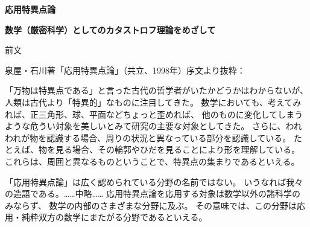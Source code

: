 \documentclass[uplatex,dvipdfmx]{jlreq}
\begin{document}
\begin{center}
  {\Huge\bfseries 応用特異点論}
\end{center}

\vspace{10pt}

\begin{center}
  {\Large\bfseries 数学（厳密科学）としてのカタストロフ理論をめざして}
\end{center}

\vspace{10pt}

\begin{center}
  {\large 前文}
\end{center}

\medskip

泉屋・石川著「応用特異点論」（共立、1998年）序文より抜粋：

「万物は特異点である」と言った古代の哲学者がいたかどうかはわからないが、
人類は古代より「特異的」なものに注目してきた。
数学においても、考えてみれば、正三角形、球、平面などちょっと歪めれば、
他のものに変化してしまうような危うい対象を美しいとみて研究の主要な対象としてきた。
さらに、われわれが物を認識する場合、周りの状況と異なっている部分を認識している。
たとえば、物を見る場合、その輪郭やひだを見ることにより形を理解している。
これらは、周囲と異なるものということで、特異点の集まりであるといえる。

「応用特異点論」は広く認められている分野の名前ではない。
いうなれば我々の造語である。……中略……
応用特異点論を応用する対象は数学以外の諸科学のみならず、
数学の内部のさまざまな分野に及ぶ。
その意味では、この分野は応用・純粋双方の数学にまたがる分野であるといえる。
\end{document}
